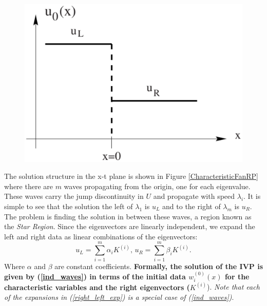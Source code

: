 \documentclass[]{article}
\begin{document}
		\begin{figure}[h] 	
			\centering
			\includegraphics[scale=.30]{RiemannProblem}
			\caption{}
			\label{RiemannProblem}
		\end{figure} 
		The solution structure in the x-t plane is shown in Figure \ref{CharacteristicFanRP} where there are $ m $ waves propagating from the origin, one for each eigenvalue. These waves carry the jump discontinuity in $ U $ and propagate with speed $ \lambda_i $. It is simple to see that the solution the left of $ \lambda_1 $ is $ u_L $ and to the right of $ \lambda_m $ is $ u_R $. The problem is finding the solution in between these waves, a region known as the \textit{Star Region}. Since the eigenvectors are linearly independent, we expand the left and right data as linear combinations of the eigenvectors:
		\begin{equation}
			u_L = \sum_{i = 1}^{m} \alpha_i K^{(i)} \mbox{,   } u_R = \sum_{i = 1}^{m} \beta_i K^{(i)}.
			\label{right_left_exp}
		\end{equation}
		Where $ \alpha $ and $ \beta $ are constant coefficients. \textbf{Formally, the solution of the IVP is given by (\ref{ind_waves}) in terms of the initial data $ w_i^{(0)}(x) $ for the characteristic variables  and the right eigenvectors ($ K^{(i)} $}). \textit{Note that each of the expansions in (\ref{right_left_exp}) is a special case of (\ref{ind_waves})}.
	
\end{document}
